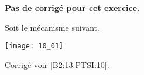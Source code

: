 \normaltrue \difficilefalse \tdifficilefalse
\correctionfalse

\setcounter{numques}{0}
\ifcorrection
\else
\textbf{Pas de corrigé pour cet exercice.}
\fi

\ifprof
\else
Soit le mécanisme suivant.
\begin{center}
\texttt{[image: 10\_01]}
\end{center}

\fi



\ifprof

\else
\fi


\ifprof
\else
\footnotesize
\ifcolle
\else

\fi

\normalsize
\begin{flushright}
\footnotesize{Corrigé  voir \ref{B2:13:PTSI:10}.}
\end{flushright}%
\fi